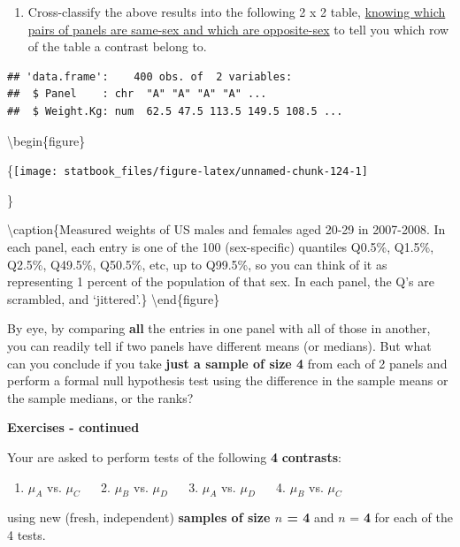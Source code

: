 \documentclass[]{book}
\providecommand{\tightlist}{%
  \setlength{\itemsep}{0pt}\setlength{\parskip}{0pt}}
\begin{document}
\begin{enumerate}
\def\labelenumi{\arabic{enumi}.}
\setcounter{enumi}{4}
\tightlist
\item
  Cross-classify the above results into the following 2 x 2 table, \href{http://www.biostat.mcgill.ca/hanley/statbook/4panelsOfSexSpecificBiorthWeights.txt}{knowing which pairs of panels are same-sex and which are opposite-sex} to tell you which row of the table a contrast belong to.
\end{enumerate}

\begin{verbatim}
## 'data.frame':    400 obs. of  2 variables:
##  $ Panel    : chr  "A" "A" "A" "A" ...
##  $ Weight.Kg: num  62.5 47.5 113.5 149.5 108.5 ...
\end{verbatim}

\textbackslash{}begin\{figure\}

\{\centering \texttt{[image: statbook\_files/figure-latex/unnamed-chunk-124-1]}

\}

\textbackslash{}caption\{Measured weights of US males and females aged 20-29 in 2007-2008. In each panel, each entry is one of the 100 (sex-specific) quantiles Q0.5\%, Q1.5\%, Q2.5\%, Q49.5\%, Q50.5\%, etc, up to Q99.5\%, so you can think of it as representing 1 percent of the population of that sex. In each panel, the Q's are scrambled, and `jittered'.\}\label{fig:unnamed-chunk-124}
\textbackslash{}end\{figure\}

By eye, by comparing \textbf{all} the entries in one panel with all of those in another, you can readily tell if two panels have different means (or medians). But what can you conclude if you take \textbf{just a sample of size 4} from each of 2 panels and perform a formal null hypothesis test using the difference in the sample means or the sample medians, or the ranks?

\textbf{Exercises - continued}

Your are asked to perform tests of the following \textbf{4} \textbf{contrasts}:

\begin{enumerate}
\def\labelenumi{\arabic{enumi}.}
\tightlist
\item
  \(\mu_A\) vs. \(\mu_C\) \(\quad\) 2. \(\mu_B\) vs. \(\mu_D\) \(\quad\) 3. \(\mu_A\) vs. \(\mu_D\) \(\quad\) 4. \(\mu_B\) vs. \(\mu_C\)
\end{enumerate}

using new (fresh, independent) \textbf{samples of size \(n\) = 4} and \(n\) = \textbf{4} for each of the 4 tests.
\end{document}
